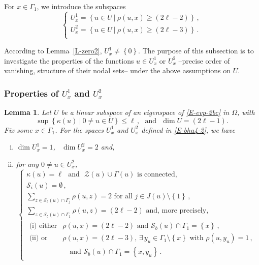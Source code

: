 \documentclass[12pt,a4paper]{amsart}
\theoremstyle{plain} %
\newtheorem{lemma}[theorem]{Lemma}
\theoremstyle{definition}
\numberwithin{equation}{section}
\numberwithin{figure}{section}
\numberwithin{table}{section}
\newcommand{\cS}{\mathcal{S}}
\newcommand{\cZ}{\mathcal{Z}}
\newcommand{\sm}{\!\setminus\!}
\newcommand{\set}[1]{\left\lbrace #1 \right\rbrace}
\begin{document}
{For $x \in \Gamma_1$, we introduce the subspaces
%
\begin{equation}\label{E-bha4-2}
\left\{
\begin{array}{l}
U^1_x = \set{u \in U ~|~ \rho(u,x) \ge (2\ell -2)}\,,\\[5pt]
U^2_x = \set{u \in U ~|~ \rho(u,x) \ge (2\ell -3)}\,.\\[5pt]
\end{array}%
\right.
\end{equation}

According to Lemma~\ref{L-zero2},  $U^1_x \neq \set{0}$. The purpose of this subsection is to investigate the properties of the functions $u \in U^1_x$ or $U^2_x$ --precise order of vanishing, structure of their nodal sets-- under the above assumptions on $U$.

\subsubsection{Properties of $U^1_x$ and $U^2_x$}\label{SSS-hmn-22a}

\begin{lemma}\label{L-Ux1}
Let $U$ be a linear subspace of an eigenspace of \eqref{E-evp-2bc} in $\Omega$, with $$ \sup\set{\kappa(u) ~|~ 0 \not = u \in U} \le \ell\,,  \text{~~and~~} \dim U = (2\ell - 1).$$ Fix some $ x \in \Gamma_1$.  For the spaces $U^1_x$ and $U^2_x$ defined in \eqref{E-bha4-2}, we have
\begin{enumerate}[(i)]
  \item $\dim U^1_x = 1$, \, $\dim U^2_x = 2$ and,
  \item  for any $0 \neq u \in U^2_x$,
  \begin{equation}\label{E-bha4-2a}
\left\{
\begin{array}{l}
\kappa(u) = \ell \text{~~and~~} \cZ(u) \cup \Gamma(u) \text{~is connected},\\[5pt]
\cS_i(u) = \emptyset\,,\\[5pt]
\sum_{z \in \cS_b(u) \cap \Gamma_j} \rho(u,z) = 2 \text{~for all~} j \in J(u)\sm \set{1}\,,\\[5pt]
\sum_{z \in \cS_b(u) \cap \Gamma_1} \rho(u,z) = (2\ell - 2) \text{~and, more precisely,}\\[5pt]
\begin{array}{ll}
\text{(i) either} & \rho(u,x) = (2\ell - 2) \text{~and~} \cS_b(u) \cap \Gamma_1 = \set{x}\,,\\[5pt]
\text{(ii) or} & \rho(u,x)  = (2\ell-3),\, \exists\, y_u \in \Gamma_1 \sm \set{x} \text{~with~} \rho(u,y_u) = 1\,,\\[5pt]
& \quad \text{and~}  \cS_b(u) \cap \Gamma_1 = \set{x,y_u}\,.
\end{array}%
\end{array}%
\right.
\end{equation}


\end{enumerate}
\end{lemma}}
\end{document}
